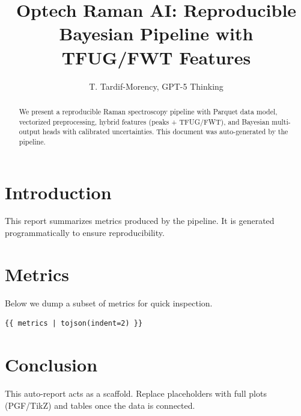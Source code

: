 \documentclass[conference]{IEEEtran}
\title{Optech Raman AI: Reproducible Bayesian Pipeline with TFUG/FWT Features}
\author{T. Tardif-Morency, GPT-5 Thinking}
\begin{document}
\maketitle

\begin{abstract}
We present a reproducible Raman spectroscopy pipeline with Parquet data model, vectorized preprocessing, hybrid features (peaks + TFUG/FWT), and Bayesian multi-output heads with calibrated uncertainties. This document was auto-generated by the pipeline.
\end{abstract}

\section{Introduction}
This report summarizes metrics produced by the pipeline. It is generated programmatically to ensure reproducibility.

\section{Metrics}
Below we dump a subset of metrics for quick inspection.

\begin{verbatim}
{{ metrics | tojson(indent=2) }}
\end{verbatim}

\section{Conclusion}
This auto-report acts as a scaffold. Replace placeholders with full plots (PGF/TikZ) and tables once the data is connected.



\end{document}

